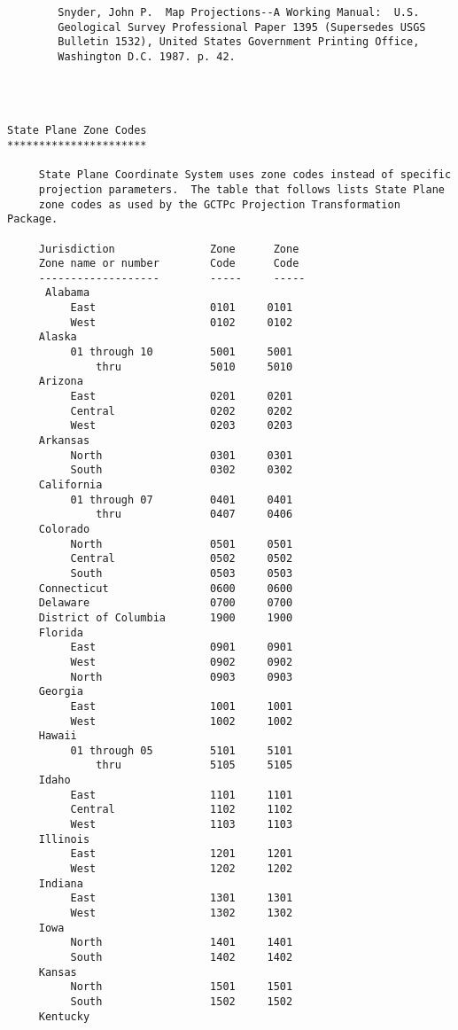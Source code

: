 \begin{verbatim}
        Snyder, John P.  Map Projections--A Working Manual:  U.S.
        Geological Survey Professional Paper 1395 (Supersedes USGS
        Bulletin 1532), United States Government Printing Office,
        Washington D.C. 1987. p. 42.




State Plane Zone Codes
**********************

     State Plane Coordinate System uses zone codes instead of specific
     projection parameters.  The table that follows lists State Plane
     zone codes as used by the GCTPc Projection Transformation Package.

     Jurisdiction               Zone      Zone
     Zone name or number        Code      Code
     -------------------        -----     -----
      Alabama
          East                  0101     0101
          West                  0102     0102
     Alaska
          01 through 10         5001     5001
              thru              5010     5010
     Arizona
          East                  0201     0201
          Central               0202     0202
          West                  0203     0203
     Arkansas
          North                 0301     0301
          South                 0302     0302
     California
          01 through 07         0401     0401
              thru              0407     0406
     Colorado
          North                 0501     0501
          Central               0502     0502
          South                 0503     0503
     Connecticut                0600     0600
     Delaware                   0700     0700
     District of Columbia       1900     1900
     Florida
          East                  0901     0901
          West                  0902     0902
          North                 0903     0903
     Georgia
          East                  1001     1001
          West                  1002     1002
     Hawaii
          01 through 05         5101     5101
              thru              5105     5105
     Idaho
          East                  1101     1101
          Central               1102     1102
          West                  1103     1103
     Illinois
          East                  1201     1201
          West                  1202     1202
     Indiana
          East                  1301     1301
          West                  1302     1302
     Iowa
          North                 1401     1401
          South                 1402     1402
     Kansas
          North                 1501     1501
          South                 1502     1502
     Kentucky

\end{verbatim}
